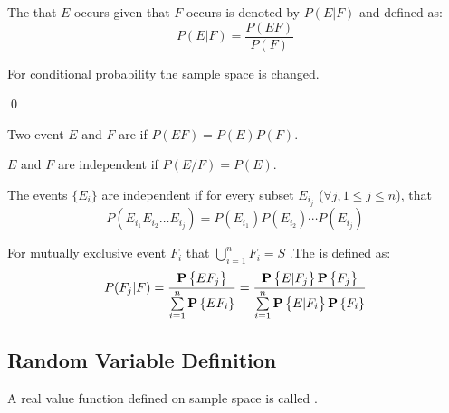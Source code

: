 \begin{definition}
    The  that $E$ occurs given that $F$ occurs is denoted by $P(E|F)$ and defined as:
    \begin{equation}
        P(E|F) = \frac{P(EF)}{P(F)}
    \end{equation}
    
    For conditional probability the sample space is changed.
    
    \qed
\end{definition}

\begin{definition}[independent]
    Two event $E$ and $F$ are  if $P(EF) = P(E) P(F)$.
\end{definition}

\begin{theorem}
    $E$ and $F$ are independent if $P(E/F) = P(E)$.    
\end{theorem}

\begin{definition}
    The events $\{ E_i \}$ are independent if for every subset $E_{i_j}$ ($ \forall j, 1 \leq j \leq n$), that
    \begin{equation}
        P(E_{i_1} E_{i_2} \dots E_{i_j}) = P(E_{i_1}) P(E_{i_2}) \cdots P(E_{i_j})
    \end{equation}
\end{definition}

\begin{definition}
    For mutually exclusive event $F_i$ that $\displaystyle \bigcup_{i=1}^n F_i = S$ .The  is defined as:
    \begin{equation}
    \displaystyle P(F_j | F) = \frac{\mathop{\bf P\/}\displaystyle \left\{EF_j\right\}}{\sum\limits_{i=1}^n \mathop{\bf P\/}\displaystyle \left\{EF_i\right\}} = \frac{\mathop{\bf P\/}\displaystyle \left\{E|F_j\right\} \mathop{\bf P\/}\displaystyle \left\{F_j\right\}}{\sum\limits_{i=1}^n \mathop{\bf P\/}\displaystyle \left\{E|F_i\right\} \mathop{\bf P\/}\displaystyle \left\{F_i\right\}}
    \end{equation}
\end{definition}




\subsection{Random Variable Definition}

\begin{definition}
    A real value function defined on sample space is called .
\end{definition}

